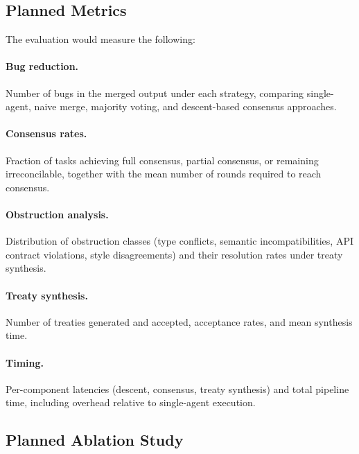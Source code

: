 \documentclass[11pt]{article}
\begin{document}
\subsection{Planned Metrics}\label{subsec:results}

The evaluation would measure the following:

\paragraph{Bug reduction.}
Number of bugs in the merged output under each strategy, comparing
single-agent, naive merge, majority voting, and descent-based
consensus approaches.

\paragraph{Consensus rates.}
Fraction of tasks achieving full consensus, partial consensus, or
remaining irreconcilable, together with the mean number of rounds
required to reach consensus.

\paragraph{Obstruction analysis.}
Distribution of obstruction classes (type conflicts, semantic
incompatibilities, API contract violations, style disagreements) and
their resolution rates under treaty synthesis.

\paragraph{Treaty synthesis.}
Number of treaties generated and accepted, acceptance rates, and mean
synthesis time.

\paragraph{Timing.}
Per-component latencies (descent, consensus, treaty synthesis) and
total pipeline time, including overhead relative to single-agent
execution.

\subsection{Planned Ablation Study}\label{subsec:ablation}
\end{document}
